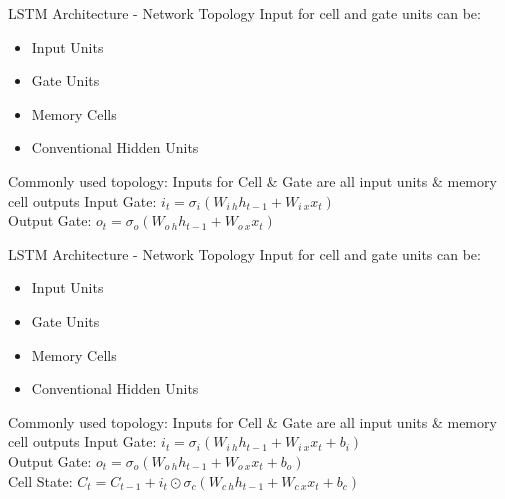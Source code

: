 \documentclass[10pt, aspectratio=169]{beamer}
\begin{document}
\begin{frame}[t]{LSTM Architecture - Network Topology}
Input for cell and gate units can be:
\begin{itemize}
    \item Input Units
    \item Gate Units
    \item Memory Cells
    \item Conventional Hidden Units
\end{itemize}
Commonly used topology: Inputs for Cell \& Gate are all input units \& memory cell outputs
Input Gate:  \begin{math}i_t=\sigma_i\left(W_{i\ h}h_{t-1}+W_{i\ x} x_t\right)\end{math}\\
Output Gate: \begin{math}o_t=\sigma_o\left(W_{o\ h}h_{t-1}+W_{o\ x}x_t\right)\end{math}
\end{frame}

\begin{frame}[t]{LSTM Architecture - Network Topology}
Input for cell and gate units can be:
\begin{itemize}
    \item Input Units
    \item Gate Units
    \item Memory Cells
    \item Conventional Hidden Units
\end{itemize}
Commonly used topology: Inputs for Cell \& Gate are all input units \& memory cell outputs
Input Gate:  \begin{math}i_t=\sigma_i\left(W_{i\ h}h_{t-1}+W_{i\ x} x_t + b_i\right)\end{math}\\
Output Gate: \begin{math}o_t=\sigma_o\left(W_{o\ h}h_{t-1}+W_{o\ x}x_t + b_o\right)\end{math}\\
Cell State: \begin{math}C_t=C_{t-1}+i_t\odot\sigma_c\left(W_{c\ h}h_{t-1}+W_{c\ x}x_t + b_c\right)\end{math} 
\end{frame}
\end{document}
